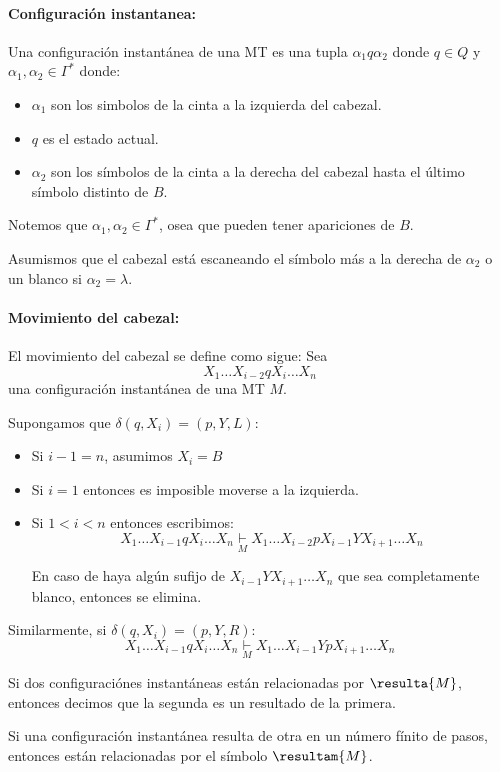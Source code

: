 \paragraph{Configuración instantanea:} Una configuración instantánea de una MT es una tupla \(\alpha_1 q \alpha_2\) donde \(q\in Q\) y \(\alpha_1,\alpha_2\in\Gamma^*\) donde:
\begin{itemize}
  \item \(\alpha_1\) son los simbolos de la cinta a la izquierda del cabezal.
  \item \(q\) es el estado actual.
  \item \(\alpha_2\) son los símbolos de la cinta a la derecha del cabezal hasta el último símbolo distinto de \(B\).
\end{itemize}
Notemos que \(\alpha_1,\alpha_2\in\Gamma^*\), osea que pueden tener apariciones de \(B\).

Asumismos que el cabezal está escaneando el símbolo más a la derecha de \(\alpha_2\) o un blanco si \(\alpha_2=\lambda\).

\paragraph{Movimiento del cabezal:} El movimiento del cabezal se define como sigue: Sea \[X_1\dots X_{i-2}qX_{i}\dots X_n\]una configuración instantánea de una MT \(M\).

Supongamos que \(\delta(q,X_i) = (p, Y, L)\):
\begin{itemize}
  \item Si \(i -1 = n\), asumimos \(X_i = B\)
  \item Si \(i = 1\) entonces es imposible moverse a la izquierda.
  \item Si \(1 < i < n\) entonces escribimos:
        \[
          X_1\dots X_{i-1}qX_{i}\dots X_n \underset{M}{\vdash} X_1\dots X_{i-2}pX_{i-1}YX_{i+1}\dots X_n
        \]

        En caso de haya algún sufijo de \(X_{i-1}YX_{i+1}\dots X_n\) que sea completamente blanco, entonces se elimina.
\end{itemize}

Similarmente, si \(\delta(q,X_i) = (p, Y, R)\):
\[
  X_1\dots X_{i-1}qX_{i}\dots X_n \underset{M}{\vdash} X_1\dots X_{i-1}YpX_{i+1}\dots X_n
\]

Si dos configuraciónes instantáneas están relacionadas por \(\resulta{M}\), entonces decimos que la segunda es un resultado de la primera.

Si una configuración instantánea resulta de otra en un número fínito de pasos, entonces están relacionadas por el símbolo \(\resultam{M}\).

